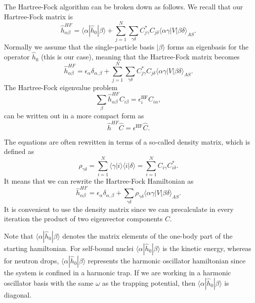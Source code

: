 \documentclass[11pt,a4wide]{article}
\begin{document}
The Hartree-Fock algorithm can be broken down as follows. We recall that 
our Hartree-Fock matrix  is 
\[
\hat{h}_{\alpha\beta}^{HF}=\langle \alpha | \hat{h}_0 | \beta \rangle+
\sum_{j=1}^N\sum_{\gamma\delta} C^*_{j\gamma}C_{j\delta}\langle \alpha\gamma|V|\beta\delta\rangle_{AS}.
\]
Normally we assume that the single-particle basis $|\beta\rangle$
forms an eigenbasis for the operator $\hat{h}_0$ (this is our case), meaning that the
Hartree-Fock matrix becomes
\[
\hat{h}_{\alpha\beta}^{HF}=\epsilon_{\alpha}\delta_{\alpha,\beta}+
\sum_{j=1}^N\sum_{\gamma\delta} C^*_{j\gamma}C_{j\delta}\langle \alpha\gamma|V|\beta\delta\rangle_{AS}.
\]
The Hartree-Fock eigenvalue problem
\[
\sum_{\beta}\hat{h}_{\alpha\beta}^{HF}C_{i\beta}=\epsilon_i^{\mathrm{HF}}C_{i\alpha},
\]
can be written out in a more compact form as
\[
\hat{h}^{HF}\hat{C}=\epsilon^{\mathrm{HF}}\hat{C}. 
\]



The equations are often rewritten in terms of a so-called density matrix,
which is defined as 
\begin{equation}
\rho_{\gamma\delta}=\sum_{i=1}^{N}\langle\gamma|i\rangle\langle i|\delta\rangle = \sum_{i=1}^{N}C_{i\gamma}C^*_{i\delta}.
\end{equation}
It means that we can rewrite the Hartree-Fock Hamiltonian as
\[
\hat{h}_{\alpha\beta}^{HF}=\epsilon_{\alpha}\delta_{\alpha,\beta}+
\sum_{\gamma\delta} \rho_{\gamma\delta}\langle \alpha\gamma|V|\beta\delta\rangle_{AS}.
\]
It is convenient to use the density matrix since we can precalculate in every iteration the product of two eigenvector components $C$. 


Note that $\langle \alpha | \hat{h}_0 | \beta \rangle$ denotes the
matrix elements of the one-body part of the starting hamiltonian. For
self-bound nuclei $\langle \alpha | \hat{h}_0 | \beta \rangle$ is the
kinetic energy, whereas for neutron drops, $\langle \alpha | \hat{h}_0
| \beta \rangle$ represents the harmonic oscillator hamiltonian since
the system is confined in a harmonic trap. If we are working in a
harmonic oscillator basis with the same $\omega$ as the trapping
potential, then $\langle \alpha | \hat{h}_0 | \beta \rangle$ is
diagonal.
\end{document}
